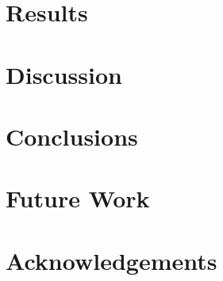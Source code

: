\documentclass[12pt]{article} %
\begin{document}
\section{Results}
\section{Discussion}
\section{Conclusions}
\section{Future Work}

\section{Acknowledgements}

\end{document}
